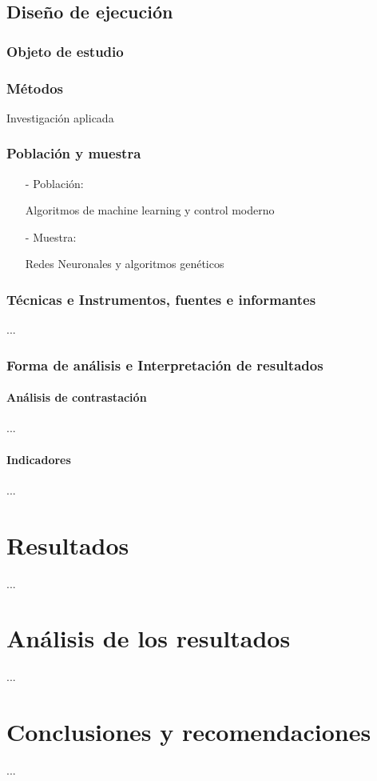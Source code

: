 \documentclass{report}
\begin{document}
\section{Diseño de ejecución}
\subsection{Objeto de estudio}

\subsection{Métodos}
Investigación aplicada
\subsection{Población y muestra}
\begin{enumerate}
\item[-] Población:

  Algoritmos de machine learning y control moderno
\item[-] Muestra:

  Redes Neuronales y algoritmos genéticos
\end{enumerate}
\subsection{Técnicas e Instrumentos, fuentes e informantes}
...
\subsection{Forma de análisis e Interpretación de resultados}
\subsubsection{Análisis de contrastación}
...
\subsubsection{Indicadores}
...
\chapter{Resultados}
...
\chapter{Análisis de los resultados}
...
\chapter{Conclusiones y recomendaciones}
...
\end{document}
